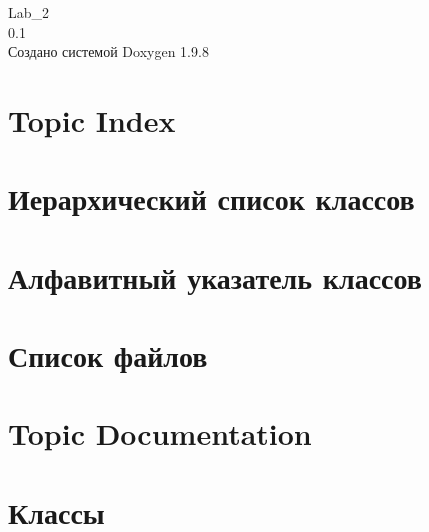 \documentclass[twoside]{book}
\newcommand{\+}{\discretionary{\mbox{\scriptsize$\hookleftarrow$}}{}{}}
\newcommand{\clearemptydoublepage}{%
    \newpage{\pagestyle{empty}\cleardoublepage}%
  }
\begin{document}
  \raggedbottom
    \hypersetup{pageanchor=false,
                bookmarksnumbered=true,
                pdfencoding=unicode
               }
  \begin{titlepage}
  \vspace*{7cm}
  \begin{center}%
  {\Large Lab\+\_\+2}\\
  [1ex]\large 0.\+1 \\
  \vspace*{1cm}
  {\large Создано системой Doxygen 1.9.8}\\
  \end{center}
  \end{titlepage}
  \clearemptydoublepage
  \tableofcontents
  \clearemptydoublepage
  \hypersetup{pageanchor=true}








\chapter{Topic Index}

\chapter{Иерархический список классов}

\chapter{Алфавитный указатель классов}

\chapter{Список файлов}

\chapter{Topic Documentation}



\chapter{Классы}




\end{document}
